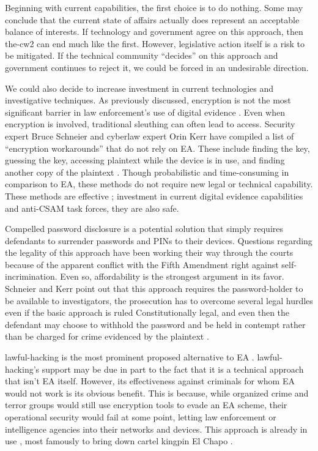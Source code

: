 Beginning with current capabilities, the first choice is to do nothing. Some may conclude that the current state of
affairs actually does represent an acceptable balance of interests. If technology and government agree on this approach,
then \ac{the-cw2} can end much like the first. However, legislative action itself is a risk to be mitigated. If the
technical community ``decides'' on this approach and government continues to reject it, we could be forced in an
undesirable direction.

We could also decide to increase investment in current technologies and investigative techniques. As previously
discussed, encryption is not the most significant barrier in law enforcement's use of digital evidence
\cite{carter_2018}. Even when encryption is involved, traditional sleuthing can often lead to access. Security expert
Bruce Schneier and cyberlaw expert Orin Kerr have compiled a list of ``encryption workarounds'' that do not rely on
\ac{EA}. These include finding the key, guessing the key, accessing plaintext while the device is in use, and finding
another copy of the plaintext \cite{kerr_encryption_2017}. Though probabilistic and time-consuming in comparison to
\ac{EA}, these methods do not require new legal or technical capability. These methods are effective
\cite{greenberg_2018}; investment in current digital evidence capabilities and anti-\ac{CSAM} task forces, they are also
safe.

Compelled password disclosure is a potential solution that simply requires defendants to surrender passwords and
\acp{PIN} to their devices. Questions regarding the legality of this approach have been working their way through the
courts \cite{bittenbender_2019} \cite{sobel_2019} because of the apparent conflict with the Fifth Amendment right
against self-incrimination. Even so, affordability is the strongest argument in its favor. Schneier and Kerr point out
that this approach requires the password-holder to be available to investigators, the prosecution has to overcome
several legal hurdles even if the basic approach is ruled Constitutionally legal, and even then the defendant may choose
to withhold the password and be held in contempt rather than be charged for crime evidenced by the plaintext
\cite{kerr_encryption_2017}.

\Ac{lawful-hacking} is the most prominent proposed alternative to \ac{EA} \cite{bellovin_lawful_2013}
\cite{hennessey_lawful_2016} \cite{rozenshtein_wicked_2018} \cite{kerr_encryption_2017} \cite{soesanto_2018}.
\Ac{lawful-hacking}'s support may be due in part to the fact that it is a technical approach that isn't \ac{EA} itself.
However, its effectiveness against criminals for whom \ac{EA} would not work is its obvious benefit. This is because,
while organized crime and terror groups would still use encryption tools to evade an \ac{EA} scheme, their operational
security would fail at some point, letting law enforcement or intelligence agencies into their networks and devices.
This approach is already in use \cite{cox_2020}, most famously to bring down cartel kingpin El Chapo
\cite{feuer_chapo_2019}.

